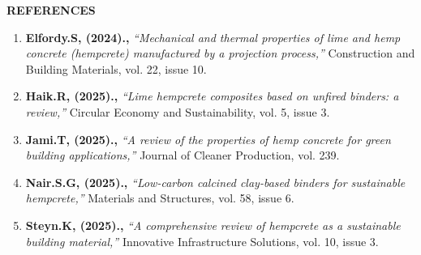 \documentclass[12pt,a4paper,final]{report}
\newcommand{\frontheading}[1]{%
  \vspace*{4.1pt}%
  \begin{center}{\bfseries\fontsize{16}{16}\selectfont #1}\end{center}%
  \vspace{0.6pt}}
\begin{document}
\newpage
\frontheading{REFERENCES}

\begingroup{} 
\fontsize{11}{14.5}\selectfont
\begin{enumerate}[label=\roman*.,leftmargin=2.4em,itemsep=10pt]
\item \textbf{Elfordy.S, (2024).,} \textit{``Mechanical and thermal properties of lime and hemp concrete (hempcrete) manufactured by a projection process,''} Construction and Building Materials, vol. 22, issue 10.

\item \textbf{Haik.R, (2025).,} \textit{``Lime hempcrete composites based on unfired binders: a review,''} Circular Economy and Sustainability, vol. 5, issue 3.

\item \textbf{Jami.T, (2025).,} \textit{``A review of the properties of hemp concrete for green building applications,''} Journal of Cleaner Production, vol. 239.

\item \textbf{Nair.S.G, (2025).,} \textit{``Low-carbon calcined clay-based binders for sustainable hempcrete,''} Materials and Structures, vol. 58, issue 6.

\item \textbf{Steyn.K, (2025).,} \textit{``A comprehensive review of hempcrete as a sustainable building material,''} Innovative Infrastructure Solutions, vol. 10, issue 3.
\end{enumerate}
\endgroup
\end{document}
